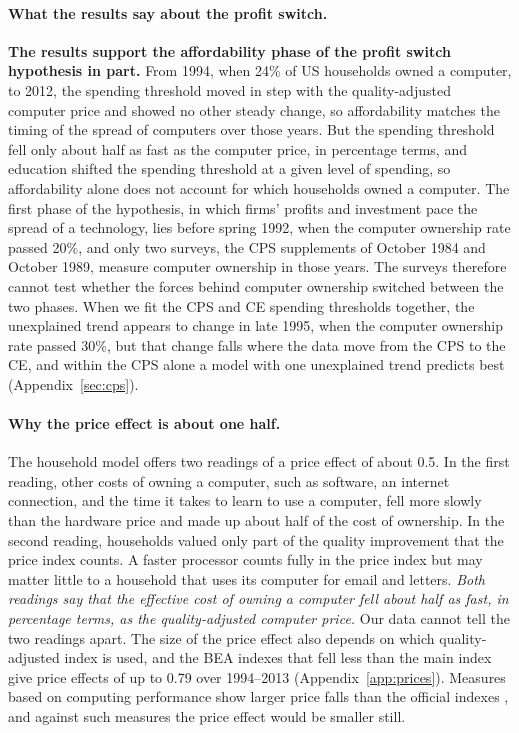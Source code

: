 \documentclass[11pt]{article}
\begin{document}
\paragraph{What the results say about the profit switch.} \textbf{The results support the affordability phase of the profit switch hypothesis in part.} From 1994, when 24\% of US households owned a computer, to 2012, the spending threshold moved in step with the quality-adjusted computer price and showed no other steady change, so affordability matches the timing of the spread of computers over those years. But the spending threshold fell only about half as fast as the computer price, in percentage terms, and education shifted the spending threshold at a given level of spending, so affordability alone does not account for which households owned a computer. The first phase of the hypothesis, in which firms' profits and investment pace the spread of a technology, lies before spring 1992, when the computer ownership rate passed 20\%, and only two surveys, the CPS supplements of October 1984 and October 1989, measure computer ownership in those years. The surveys therefore cannot test whether the forces behind computer ownership switched between the two phases. When we fit the CPS and CE spending thresholds together, the unexplained trend appears to change in late 1995, when the computer ownership rate passed 30\%, but that change falls where the data move from the CPS to the CE, and within the CPS alone a model with one unexplained trend predicts best (Appendix~\ref{sec:cps}).

\paragraph{Why the price effect is about one half.} The household model offers two readings of a price effect of about 0.5. In the first reading, other costs of owning a computer, such as software, an internet connection, and the time it takes to learn to use a computer, fell more slowly than the hardware price and made up about half of the cost of ownership. In the second reading, households valued only part of the quality improvement that the price index counts. A faster processor counts fully in the price index but may matter little to a household that uses its computer for email and letters. \emph{Both readings say that the effective cost of owning a computer fell about half as fast, in percentage terms, as the quality-adjusted computer price.} Our data cannot tell the two readings apart. The size of the price effect also depends on which quality-adjusted index is used, and the BEA indexes that fell less than the main index give price effects of up to 0.79 over 1994--2013 (Appendix~\ref{app:prices}). Measures based on computing performance show larger price falls than the official indexes \citep{nordhaus2007}, and against such measures the price effect would be smaller still.
\end{document}
